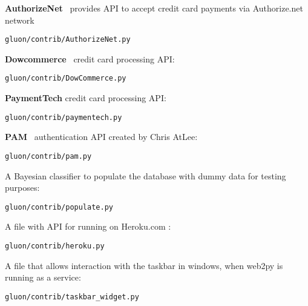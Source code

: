 \documentclass[justified,sixbynine,notoc]{tufte-book}
\def\inxx#1{\index{#1}}
\begin{document}
\begin{fullwidth}
{\bf AuthorizeNet}~\cite{authorizenet}  provides API to accept credit card payments via Authorize.net network
\begin{lstlisting}
gluon/contrib/AuthorizeNet.py
\end{lstlisting}

{\bf Dowcommerce}~\cite{dowcommerce} credit card processing API:
\begin{lstlisting}
gluon/contrib/DowCommerce.py
\end{lstlisting}

{\bf PaymentTech} credit card processing API:

\begin{lstlisting}
gluon/contrib/paymentech.py
\end{lstlisting}

{\bf PAM}~\cite{PAM}  authentication API created by Chris AtLee:
\begin{lstlisting}
gluon/contrib/pam.py
\end{lstlisting}

A Bayesian classifier to populate the database with dummy data for testing purposes:
\begin{lstlisting}
gluon/contrib/populate.py
\end{lstlisting}

A file with API for running on Heroku.com : \inxx{heroku}

\begin{lstlisting}
gluon/contrib/heroku.py
\end{lstlisting}

A file that allows interaction with the taskbar in windows, when web2py is running as a service:
\begin{lstlisting}
gluon/contrib/taskbar_widget.py
\end{lstlisting}


\end{fullwidth}
\end{document}

